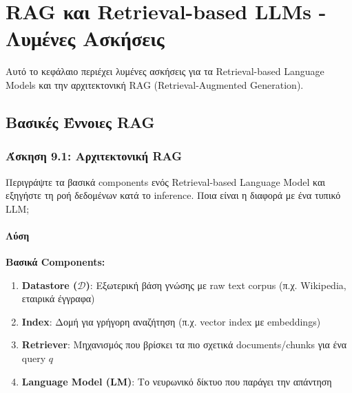 
\chapter{RAG και Retrieval-based LLMs - Λυμένες Ασκήσεις}
\label{ch:rag-exercises}

Αυτό το κεφάλαιο περιέχει λυμένες ασκήσεις για τα Retrieval-based Language Models
και την αρχιτεκτονική RAG (Retrieval-Augmented Generation).

\section{Βασικές Έννοιες RAG}

\subsection{Άσκηση 9.1: Αρχιτεκτονική RAG}

\begin{formulabox}[Εκφώνηση]
Περιγράψτε τα βασικά components ενός Retrieval-based Language Model και εξηγήστε
τη ροή δεδομένων κατά το inference. Ποια είναι η διαφορά με ένα τυπικό LLM;
\end{formulabox}

\subsubsection*{Λύση}

\textbf{Βασικά Components:}

\begin{enumerate}
    \item \textbf{Datastore ($\mathcal{D}$)}: Εξωτερική βάση γνώσης με raw text corpus
    (π.χ. Wikipedia, εταιρικά έγγραφα)

    \item \textbf{Index}: Δομή για γρήγορη αναζήτηση (π.χ. vector index με embeddings)

    \item \textbf{Retriever}: Μηχανισμός που βρίσκει τα πιο σχετικά documents/chunks
    για ένα query $q$

    \item \textbf{Language Model (LM)}: Το νευρωνικό δίκτυο που παράγει την απάντηση
\end{enumerate}

